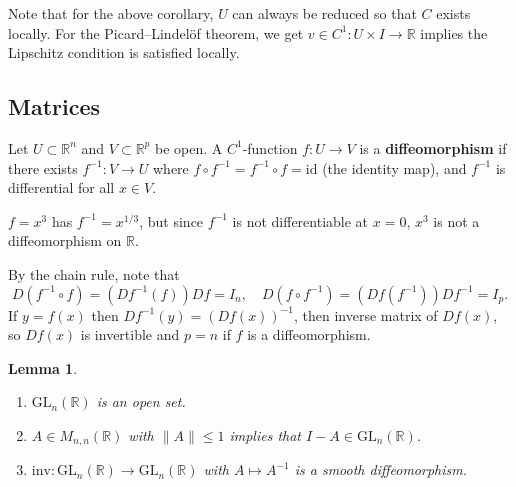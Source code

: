 \documentclass[letter-paper]{tufte-book}
\newtheorem{lemma}[theorem]{\color{pastel-blue}Lemma}
\newenvironment{example}[1][Example]{\begin{trivlist}
\item[\hskip \labelsep {\bfseries #1}]}{\end{trivlist}}
\begin{document}
Note that for the above corollary, $U$ can always be reduced so that $C$ exists
locally. For the Picard--Lindel\"of theorem, we get $v \in C^1 : U \times I \to
\mathbb{R}$ implies the Lipschitz condition is satisfied locally.


\subsection{Matrices}

Let $U \subset \mathbb{R}^n$ and $V \subset \mathbb{R}^p$ be open. A
$C^1$-function $f : U \to V$ is a \textbf{diffeomorphism} if there exists
$f^{-1} : V \to U$ where $f \circ f^{-1} = f^{-1} \circ f = \mbox{id}$ (the
identity map), and $f^{-1}$ is differential for all $x \in V$.

\begin{example}
  $f = x^3$ has $f^{-1} = x^{1/3}$, but since $f^{-1}$ is not differentiable at
  $x=0$, $x^3$ is not a diffeomorphism on $\mathbb{R}$.
\end{example}

By the chain rule, note that
\begin{equation*}
  D(f^{-1} \circ f) = \left(Df^{-1}(f)\right) Df = I_n, \quad D(f \circ f^{-1}) = \left(Df(f^{-1})\right) Df^{-1} = I_p.
\end{equation*}
If $y = f(x)$ then $Df^{-1}(y) = (Df(x))^{-1}$, then inverse matrix of $Df(x)$,
so $Df(x)$ is invertible and $p=n$ if $f$ is a diffeomorphism.

\begin{lemma}
  \begin{enumerate}
    \item $\mbox{GL}_n(\mathbb{R})$ is an open set.
    \item $A \in M_{n,n}(\mathbb{R})$ with $\|A\| \leq 1$ implies that $I - A \in
    \mbox{GL}_n(\mathbb{R})$.
    \item $\mbox{inv} : \mbox{GL}_n(\mathbb{R}) \to \mbox{GL}_n(\mathbb{R})$
    with $A \mapsto A^{-1}$ is a smooth diffeomorphism.
  \end{enumerate}
\end{lemma}
\end{document}
